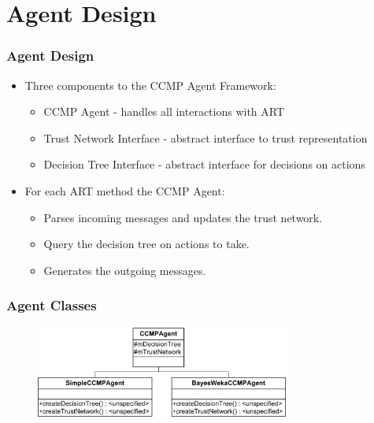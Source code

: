 \section{Agent Design}
\begin{frame}
\frametitle{Agent Design}
\begin{itemize}
  \item Three components to the CCMP Agent Framework:
  \begin{itemize}
    \item CCMP Agent - handles all interactions with ART
    \item Trust Network Interface - abstract interface to trust representation
    \item Decision Tree Interface - abstract interface for decisions on actions
  \end{itemize}
\end{itemize}
\begin{itemize}
  \item For each ART method the CCMP Agent:
  \begin{itemize}
    \item Parses incoming messages and updates the trust network.
    \item Query the decision tree on actions to take.
    \item Generates the outgoing messages.
  \end{itemize}
\end{itemize}
\end{frame}

\begin{frame}
\frametitle{Agent Classes}
\begin{figure}
\centering
\includegraphics[height=3cm]{../report/images/ccmpclasses.jpg}
\end{figure}
\end{frame}
